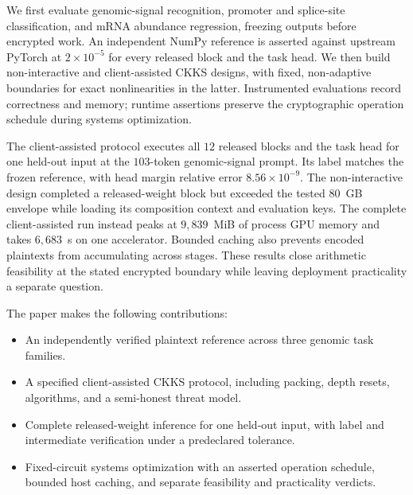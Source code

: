We first evaluate genomic-signal recognition, promoter and splice-site classification, and mRNA
abundance regression, freezing outputs before encrypted work. An independent NumPy reference is
asserted against upstream PyTorch at $2\times10^{-5}$ for every released block and the task head.
We then build non-interactive and client-assisted CKKS designs, with fixed, non-adaptive boundaries
for exact nonlinearities in the latter. Instrumented evaluations record correctness and memory;
runtime assertions preserve the cryptographic operation schedule during systems optimization.

The client-assisted protocol executes all $12$ released blocks and the task head for one held-out
input at the $103$-token genomic-signal prompt. Its label matches the frozen reference, with head
margin relative error $8.56\times10^{-9}$. The non-interactive design completed a released-weight
block but exceeded the tested $80$~GB envelope while loading its composition context and evaluation
keys. The complete client-assisted run instead peaks at $9{,}839$~MiB of process GPU memory and
takes $6{,}683$~s on one accelerator. Bounded caching also prevents encoded plaintexts from
accumulating across stages. These results close arithmetic feasibility at the stated encrypted
boundary while leaving deployment practicality a separate question.

The paper makes the following contributions:

\begin{itemize}
  \item An independently verified plaintext reference across three genomic task families.
  \item A specified client-assisted CKKS protocol, including packing, depth resets, algorithms,
        and a semi-honest threat model.
  \item Complete released-weight inference for one held-out input, with label and intermediate
        verification under a predeclared tolerance.
  \item Fixed-circuit systems optimization with an asserted operation schedule, bounded host
        caching, and separate feasibility and practicality verdicts.
\end{itemize}
